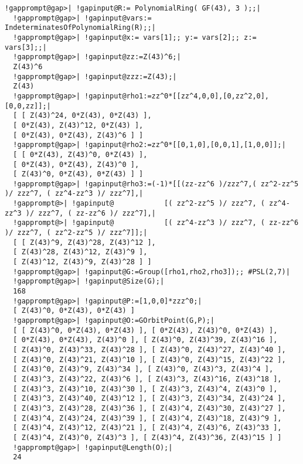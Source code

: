 \documentclass[a4paper,11pt]{report}
\begin{document}
{{ 
\begin{Verbatim}[commandchars=!@|,fontsize=\small,frame=single,label=Example]
  !gapprompt@gap>| !gapinput@R:= PolynomialRing( GF(43), 3 );;|
  !gapprompt@gap>| !gapinput@vars:= IndeterminatesOfPolynomialRing(R);;|
  !gapprompt@gap>| !gapinput@x:= vars[1];; y:= vars[2];; z:= vars[3];;|
  !gapprompt@gap>| !gapinput@zz:=Z(43)^6;|
  Z(43)^6
  !gapprompt@gap>| !gapinput@zzz:=Z(43);|
  Z(43)
  !gapprompt@gap>| !gapinput@rho1:=zz^0*[[zz^4,0,0],[0,zz^2,0],[0,0,zz]];|
  [ [ Z(43)^24, 0*Z(43), 0*Z(43) ], 
  [ 0*Z(43), Z(43)^12, 0*Z(43) ], 
  [ 0*Z(43), 0*Z(43), Z(43)^6 ] ]
  !gapprompt@gap>| !gapinput@rho2:=zz^0*[[0,1,0],[0,0,1],[1,0,0]];|
  [ [ 0*Z(43), Z(43)^0, 0*Z(43) ], 
  [ 0*Z(43), 0*Z(43), Z(43)^0 ], 
  [ Z(43)^0, 0*Z(43), 0*Z(43) ] ]
  !gapprompt@gap>| !gapinput@rho3:=(-1)*[[(zz-zz^6 )/zzz^7,( zz^2-zz^5 )/ zzz^7, ( zz^4-zz^3 )/ zzz^7],|
  !gapprompt@>| !gapinput@            [( zz^2-zz^5 )/ zzz^7, ( zz^4-zz^3 )/ zzz^7, ( zz-zz^6 )/ zzz^7],|
  !gapprompt@>| !gapinput@            [( zz^4-zz^3 )/ zzz^7, ( zz-zz^6 )/ zzz^7, ( zz^2-zz^5 )/ zzz^7]];|
  [ [ Z(43)^9, Z(43)^28, Z(43)^12 ], 
  [ Z(43)^28, Z(43)^12, Z(43)^9 ], 
  [ Z(43)^12, Z(43)^9, Z(43)^28 ] ]
  !gapprompt@gap>| !gapinput@G:=Group([rho1,rho2,rho3]);; #PSL(2,7)|
  !gapprompt@gap>| !gapinput@Size(G);|
  168
  !gapprompt@gap>| !gapinput@P:=[1,0,0]*zzz^0;|
  [ Z(43)^0, 0*Z(43), 0*Z(43) ]
  !gapprompt@gap>| !gapinput@O:=GOrbitPoint(G,P);|
  [ [ Z(43)^0, 0*Z(43), 0*Z(43) ], [ 0*Z(43), Z(43)^0, 0*Z(43) ], 
  [ 0*Z(43), 0*Z(43), Z(43)^0 ], [ Z(43)^0, Z(43)^39, Z(43)^16 ], 
  [ Z(43)^0, Z(43)^33, Z(43)^28 ], [ Z(43)^0, Z(43)^27, Z(43)^40 ],
  [ Z(43)^0, Z(43)^21, Z(43)^10 ], [ Z(43)^0, Z(43)^15, Z(43)^22 ], 
  [ Z(43)^0, Z(43)^9, Z(43)^34 ], [ Z(43)^0, Z(43)^3, Z(43)^4 ], 
  [ Z(43)^3, Z(43)^22, Z(43)^6 ], [ Z(43)^3, Z(43)^16, Z(43)^18 ],
  [ Z(43)^3, Z(43)^10, Z(43)^30 ], [ Z(43)^3, Z(43)^4, Z(43)^0 ], 
  [ Z(43)^3, Z(43)^40, Z(43)^12 ], [ Z(43)^3, Z(43)^34, Z(43)^24 ], 
  [ Z(43)^3, Z(43)^28, Z(43)^36 ], [ Z(43)^4, Z(43)^30, Z(43)^27 ],
  [ Z(43)^4, Z(43)^24, Z(43)^39 ], [ Z(43)^4, Z(43)^18, Z(43)^9 ], 
  [ Z(43)^4, Z(43)^12, Z(43)^21 ], [ Z(43)^4, Z(43)^6, Z(43)^33 ], 
  [ Z(43)^4, Z(43)^0, Z(43)^3 ], [ Z(43)^4, Z(43)^36, Z(43)^15 ] ]
  !gapprompt@gap>| !gapinput@Length(O);|
  24
  

\end{Verbatim}}}
\end{document}
